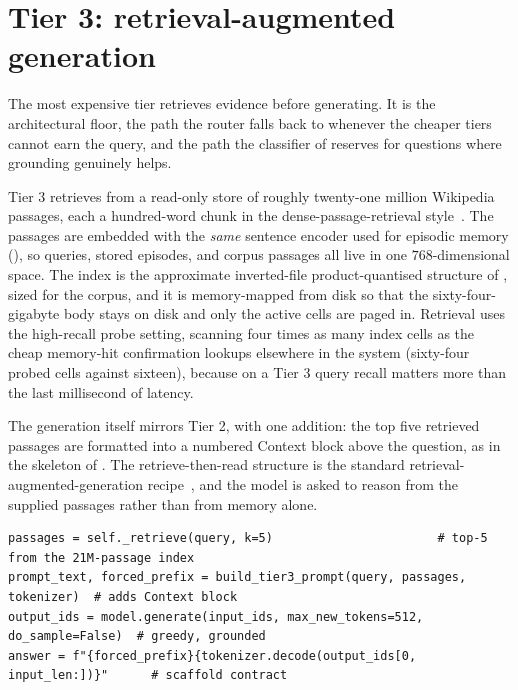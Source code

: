 \section{Tier 3: retrieval-augmented generation}
\label{sec:tiers-tier3}

The most expensive tier retrieves evidence before generating. It is the architectural
floor, the path the router falls back to whenever the cheaper tiers cannot earn the
query, and the path the classifier of  reserves for questions where
grounding genuinely helps.

\begin{fromcode}
Tier 3 retrieves from a read-only store of roughly twenty-one million Wikipedia
passages, each a hundred-word chunk in the dense-passage-retrieval
style~\cite{karpukhin-etal-2020-dense}. The passages are embedded with the \emph{same}
sentence encoder used for episodic memory (), so queries,
stored episodes, and corpus passages all live in one $768$-dimensional space. The index
is the approximate inverted-file product-quantised structure of ,
sized for the corpus, and it is memory-mapped from disk so that the sixty-four-gigabyte
body stays on disk and only the active cells are paged in. Retrieval uses the high-recall
probe setting, scanning four times as many index cells as the cheap memory-hit
confirmation lookups elsewhere in the system (sixty-four probed cells against sixteen),
because on a Tier 3 query recall matters more than the last millisecond of latency.
\end{fromcode}

The generation itself mirrors Tier 2, with one addition: the top five retrieved passages
are formatted into a numbered Context block above the question, as in the skeleton of
. The retrieve-then-read structure is the standard
retrieval-augmented-generation recipe~\cite{NEURIPS2020_6b493230}, and the model is asked
to reason from the supplied passages rather than from memory alone.

\begin{lstlisting}[caption={Tier 3 retrieve-then-generate, condensed from \texttt{caem/retrieval/rag.py}.}, label={lst:tier3}]
passages = self._retrieve(query, k=5)                       # top-5 from the 21M-passage index
prompt_text, forced_prefix = build_tier3_prompt(query, passages, tokenizer)  # adds Context block
output_ids = model.generate(input_ids, max_new_tokens=512, do_sample=False)  # greedy, grounded
answer = f"{forced_prefix}{tokenizer.decode(output_ids[0, input_len:])}"      # scaffold contract
\end{lstlisting}

